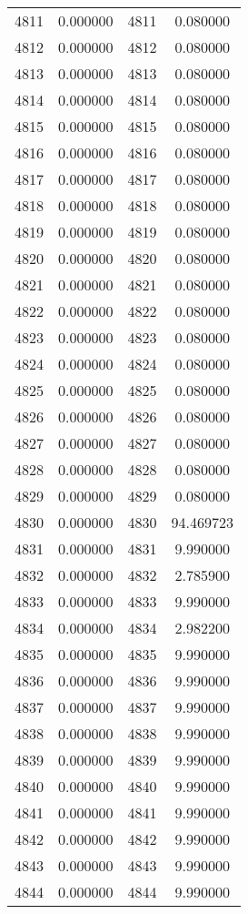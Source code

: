 \documentclass[12pt]{article}
\begin{document}
\begin{longtable}{@{}cccc@{}}
4811 & 0.000000 & 4811 & 0.080000 \\
4812 & 0.000000 & 4812 & 0.080000 \\
4813 & 0.000000 & 4813 & 0.080000 \\
4814 & 0.000000 & 4814 & 0.080000 \\
4815 & 0.000000 & 4815 & 0.080000 \\
4816 & 0.000000 & 4816 & 0.080000 \\
4817 & 0.000000 & 4817 & 0.080000 \\
4818 & 0.000000 & 4818 & 0.080000 \\
4819 & 0.000000 & 4819 & 0.080000 \\
4820 & 0.000000 & 4820 & 0.080000 \\
4821 & 0.000000 & 4821 & 0.080000 \\
4822 & 0.000000 & 4822 & 0.080000 \\
4823 & 0.000000 & 4823 & 0.080000 \\
4824 & 0.000000 & 4824 & 0.080000 \\
4825 & 0.000000 & 4825 & 0.080000 \\
4826 & 0.000000 & 4826 & 0.080000 \\
4827 & 0.000000 & 4827 & 0.080000 \\
4828 & 0.000000 & 4828 & 0.080000 \\
4829 & 0.000000 & 4829 & 0.080000 \\
4830 & 0.000000 & 4830 & 94.469723 \\
4831 & 0.000000 & 4831 & 9.990000 \\
4832 & 0.000000 & 4832 & 2.785900 \\
4833 & 0.000000 & 4833 & 9.990000 \\
4834 & 0.000000 & 4834 & 2.982200 \\
4835 & 0.000000 & 4835 & 9.990000 \\
4836 & 0.000000 & 4836 & 9.990000 \\
4837 & 0.000000 & 4837 & 9.990000 \\
4838 & 0.000000 & 4838 & 9.990000 \\
4839 & 0.000000 & 4839 & 9.990000 \\
4840 & 0.000000 & 4840 & 9.990000 \\
4841 & 0.000000 & 4841 & 9.990000 \\
4842 & 0.000000 & 4842 & 9.990000 \\
4843 & 0.000000 & 4843 & 9.990000 \\
4844 & 0.000000 & 4844 & 9.990000 \\

\end{longtable}
\end{document}
